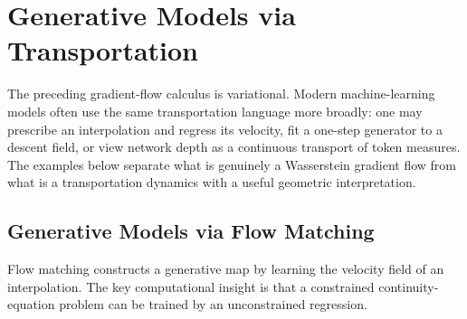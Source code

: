
\chapter{Generative Models via Transportation}
\label{sec-generative-models-transportation}

The preceding gradient-flow calculus is variational. Modern machine-learning models often use the same transportation language more broadly: one may prescribe an interpolation and regress its velocity, fit a one-step generator to a descent field, or view network depth as a continuous transport of token measures. The examples below separate what is genuinely a Wasserstein gradient flow from what is a transportation dynamics with a useful geometric interpretation.

\section{Generative Models via Flow Matching}

Flow matching constructs a generative map by learning the velocity field of an interpolation. The key computational insight is that a constrained continuity-equation problem can be trained by an unconstrained regression.

